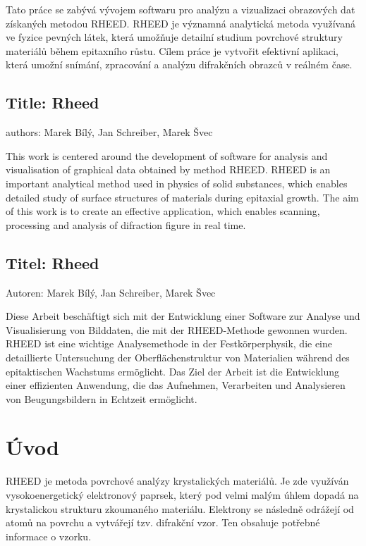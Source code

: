 \documentclass{article}
\begin{document}
Tato práce se zabývá vývojem softwaru pro analýzu a vizualizaci obrazových dat získaných metodou RHEED. RHEED je významná analytická metoda využívaná ve fyzice pevných látek, která umožňuje detailní studium povrchové struktury materiálů během epitaxního růstu. Cílem práce je vytvořit efektivní aplikaci, která umožní snímání, zpracování a analýzu difrakčních obrazců v reálném čase.

\subsection*{Title: Rheed}
authors: Marek Bílý, Jan Schreiber, Marek Švec
\vspace{0.5cm}

This work is centered around the development of software for analysis and visualisation of graphical data obtained by method RHEED. RHEED is an important analytical method used in physics of solid substances, which enables detailed study of surface structures of materials during epitaxial growth. The aim of this work is to create an effective application, which enables scanning, processing and analysis of difraction figure in real time.

\subsection*{Titel: Rheed}
Autoren: Marek Bílý, Jan Schreiber, Marek Švec
\vspace{0.5cm}

Diese Arbeit beschäftigt sich mit der Entwicklung einer Software zur Analyse und Visualisierung von Bilddaten, die mit der RHEED-Methode gewonnen wurden. RHEED ist eine wichtige Analysemethode in der Festkörperphysik, die eine detaillierte Untersuchung der Oberflächenstruktur von Materialien während des epitaktischen Wachstums ermöglicht. Das Ziel der Arbeit ist die Entwicklung einer effizienten Anwendung, die das Aufnehmen, Verarbeiten und Analysieren von Beugungsbildern in Echtzeit ermöglicht. 
\newpage

\section{Úvod}
    RHEED je metoda povrchové analýzy krystalických materiálů. Je zde využíván vysokoenergetický elektronový paprsek, který pod velmi malým úhlem dopadá na krystalickou strukturu zkoumaného materiálu. Elektrony se následně odrážejí od atomů na povrchu a vytvářejí tzv. difrakční vzor. Ten obsahuje potřebné informace o vzorku.\\
\end{document}
